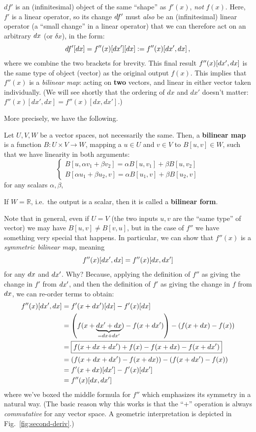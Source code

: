 $df'$ is an (infinitesimal) object of the same ``shape'' as $f'(x)$, \emph{not} $f(x)$.  Here, $f'$ is a linear operator,
so its change $d f'$ must \emph{also} be an (infinitesimal) linear operator (a ``small change'' in a linear operator)
that we can therefore act on an arbitrary
$d x$ (or $\delta x$), in the form: 
\[
df'[dx] = f''(x) [d x'][d x] := f''(x) [d x', d x] \, ,
\]
where we combine the two brackets for brevity. This final result $f''(x) [d x', d x]$ is the same type of object (vector) as the original output $f(x)$.  This implies that $f''(x)$ is a \textit{bilinear map}: acting on \textbf{two} vectors, and linear in either vector taken individually.  (We will see shortly that the ordering of $dx$ and $dx'$ doesn't matter: $f''(x)[dx',dx]=f''(x)[dx,dx']$.)  

More precisely, we have the following.
\begin{definition}
    Let $U,V,W$ be a vector spaces, not necessarily the same. Then, a \textbf{bilinear map} is a function $B:U\times V \to W$, mapping a $u \in U$ and $v \in V$ to $B[u,v] \in W$, such that we have linearity in both arguments:
    \[
    \begin{cases}
        B[u, \alpha v_1 + \beta v_2] = \alpha B[u,v_1] + \beta B[u,v_2] \\
        B[\alpha u_1 + \beta u_2, v] = \alpha B[u_1,v] + \beta B[u_2,v]
    \end{cases}
    \]
     for any scalars $\alpha, \beta$,

     If $W = \mathbb{R}$, i.e.~the output is a scalar, then it is called a \textbf{bilinear form}.
\end{definition}

Note that in general, even if $U = V$ (the two inputs $u,v$ are the ``same type'' of vector) we may have $B[u,v] \neq B[v,u]$, but in the case of $f''$ we have something very special that happens. In particular, we can show that $f''(x)$ is a \textit{symmetric bilinear map}, meaning 
\[
f''(x) [d x', d x] = f''(x) [d x, d x']
\]
for any $d x$ and $d x'$.  Why? Because, applying the definition of $f''$ as giving the change in $f'$ from $d x'$, and then the definition of $f'$ as giving the change in $f$ from $d x$, we can  re-order terms to obtain: 
\begin{align*}
    f''(x) [d x', d x] &= f'(x + 
    d x') [d x] - f'(x) [d x] \\
    &= \left(f(x+ \underbrace{d x' + d x}_{= d x + d x'}) - f(x+ d x')\right) - \left(f(x+ d x) - f(x)\right) \\ 
    &= \boxed{f(x + d x + d x') + f(x) - f(x + d x) - f(x + d x')} \\
    &= \left(f(x + d x + d x')  - f(x + d x)\right) - \left(f(x + d x') - f(x)\right) \\
    &= f'(x + 
    d x) [d x'] - f'(x) [d x'] \\
    &= f''(x) [d x, d x'] \, 
\end{align*}
where we've boxed the middle formula for $f''$ which emphasizes its symmetry in a natural way.
(The basic reason why this works is that the ``$+$'' operation is always \emph{commutative} for any vector space. A geometric interpretation is depicted in Fig.~\ref{fig:second-deriv}.)

